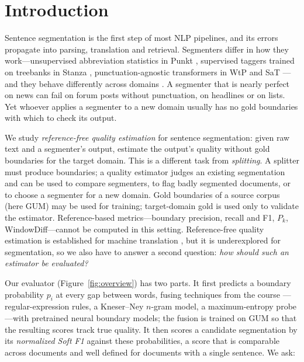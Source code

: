 
\section{Introduction}
\label{sec:intro}

Sentence segmentation is the first step of most NLP pipelines, and its errors propagate into parsing, translation and
retrieval. Segmenters differ in how they work---unsupervised abbreviation statistics in Punkt
\citep{kiss-strunk-2006-unsupervised}, supervised taggers trained on treebanks in Stanza \citep{qi-etal-2020-stanza},
punctuation-agnostic transformers in WtP and SaT \citep{minixhofer-etal-2023-wheres,frohmann-etal-2024-segment}---and
they behave differently across domains \citep{read-etal-2012-sentence}. A segmenter that is nearly perfect on news can
fail on forum posts without punctuation, on headlines or on lists. Yet whoever applies a segmenter to a new domain
usually has no gold boundaries with which to check its output.

We study \emph{reference-free quality estimation} for sentence segmentation: given raw text and a segmenter's output,
estimate the output's quality without gold boundaries for the target domain. This is a different task from
\emph{splitting}. A splitter must produce boundaries; a quality estimator judges an existing segmentation and can be used
to compare segmenters, to flag badly segmented documents, or to choose a segmenter for a new domain. Gold boundaries of a
source corpus (here GUM) may be used for training; target-domain gold is used only to validate the estimator.
Reference-based metrics---boundary precision, recall and F1, $P_k$, WindowDiff---cannot be computed in this setting.
Reference-free quality estimation is established for machine translation \citep{specia-etal-2018-quality}, but it is
underexplored for segmentation, so we also have to answer a second question: \emph{how should such an estimator be
evaluated?}

Our evaluator (Figure~\ref{fig:overview}) has two parts. It first predicts a boundary probability $p_i$ at every gap
between words, fusing techniques from the course \citep{jurafsky-martin-slp3}---regular-expression rules, a Kneser--Ney $n$-gram
model, a maximum-entropy probe---with pretrained neural boundary models; the fusion is trained on GUM so that the resulting scores
track true quality. It then scores a candidate segmentation by its \emph{normalized Soft F1} against these
probabilities, a score that is comparable across documents and well defined for documents with a single sentence. We ask:

